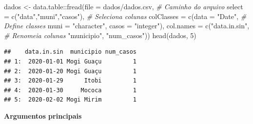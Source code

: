 \documentclass[
]{book}
\newenvironment{Shaded}{\begin{snugshade}}{\end{snugshade}}
\newcommand{\AttributeTok}[1]{\textcolor[rgb]{0.77,0.63,0.00}{#1}}
\newcommand{\CommentTok}[1]{\textcolor[rgb]{0.56,0.35,0.01}{\textit{#1}}}
\newcommand{\DecValTok}[1]{\textcolor[rgb]{0.00,0.00,0.81}{#1}}
\newcommand{\FunctionTok}[1]{\textcolor[rgb]{0.00,0.00,0.00}{#1}}
\newcommand{\NormalTok}[1]{#1}
\newcommand{\OtherTok}[1]{\textcolor[rgb]{0.56,0.35,0.01}{#1}}
\newcommand{\SpecialCharTok}[1]{\textcolor[rgb]{0.00,0.00,0.00}{#1}}
\newcommand{\StringTok}[1]{\textcolor[rgb]{0.31,0.60,0.02}{#1}}
\theoremstyle{definition}
\theoremstyle{definition}
\theoremstyle{definition}
\theoremstyle{definition}
\theoremstyle{remark}
\begin{document}
\begin{Shaded}
\begin{Highlighting}[]
\NormalTok{dados }\OtherTok{\textless{}{-}}\NormalTok{ data.table}\SpecialCharTok{::}\FunctionTok{fread}\NormalTok{(}\AttributeTok{file =} \StringTok{\textquotesingle{}dados/dados.csv\textquotesingle{}}\NormalTok{,            }\CommentTok{\# Caminho do arquivo}
                           \AttributeTok{select =} \FunctionTok{c}\NormalTok{(}\StringTok{"data"}\NormalTok{,}\StringTok{"muni"}\NormalTok{,}\StringTok{"casos"}\NormalTok{),   }\CommentTok{\# Seleciona colunas}
                           \AttributeTok{colClasses =} \FunctionTok{c}\NormalTok{(}\AttributeTok{data =} \StringTok{"Date"}\NormalTok{,        }\CommentTok{\# Define classes}
                                          \AttributeTok{muni =} \StringTok{"character"}\NormalTok{,}
                                          \AttributeTok{casos =} \StringTok{"integer"}\NormalTok{),}
                           \AttributeTok{col.names =} \FunctionTok{c}\NormalTok{(}\StringTok{"data.in.sin"}\NormalTok{,         }\CommentTok{\# Renomeia colunas}
                                         \StringTok{"municipio"}\NormalTok{, }
                                         \StringTok{"num\_casos"}\NormalTok{)) }
\FunctionTok{head}\NormalTok{(dados, }\DecValTok{5}\NormalTok{)}
\end{Highlighting}
\end{Shaded}

\begin{verbatim}
##    data.in.sin  municipio num_casos
## 1:  2020-01-01 Mogi Guaçu         1
## 2:  2020-01-20 Mogi Guaçu         1
## 3:  2020-01-29      Itobi         1
## 4:  2020-01-30     Mococa         1
## 5:  2020-02-02 Mogi Mirim         1
\end{verbatim}

\textbf{Argumentos principais}
\end{document}
